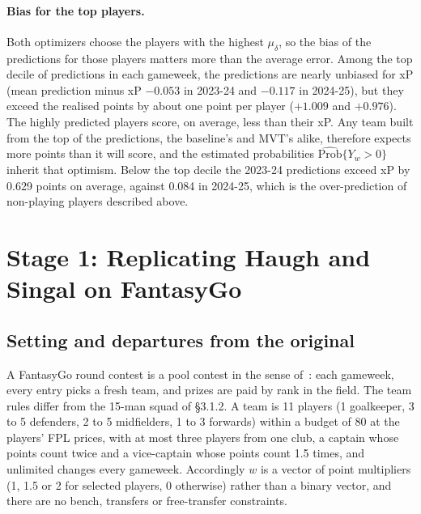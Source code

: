 \documentclass[12pt,oneside,a4paper]{book}
\theoremstyle{definition}
\theoremstyle{remark}
\begin{document}
	\paragraph{Bias for the top players.} Both optimizers choose the players with the highest
	$\mu_\delta$, so the bias of the predictions for those players matters more than the average
	error. Among the top decile of predictions in each gameweek, the predictions are nearly unbiased
	for xP (mean prediction minus xP $-0.053$ in 2023-24 and $-0.117$ in 2024-25), but they exceed
	the realised points by about one point per player ($+1.009$ and $+0.976$). The highly predicted
	players score, on average, less than their xP. Any team built from the top of the predictions,
	the baseline's and MVT's alike, therefore expects more points than it will score, and the
	estimated probabilities $\widehat{\mathrm{Prob}}\{Y_w>0\}$ inherit that optimism. Below the top
	decile the 2023-24 predictions exceed xP by 0.629 points on average, against 0.084 in 2024-25,
	which is the over-prediction of non-playing players described above.

	\section{Stage 1: Replicating Haugh and Singal on FantasyGo}
	\label{sec:s1}

	\subsection{Setting and departures from the original}
	\label{sec:s1-setting}

	A FantasyGo round contest is a pool contest in the sense of~\cite{haugh2021}: each gameweek,
	every entry picks a fresh team, and prizes are paid by rank in the field. The team rules differ
	from the 15-man squad of §3.1.2. A team is 11 players (1 goalkeeper, 3 to 5 defenders, 2 to 5
	midfielders, 1 to 3 forwards) within a budget of 80 at the players' FPL prices, with at most
	three players from one club, a captain whose points count twice and a vice-captain whose points
	count 1.5 times, and unlimited changes every gameweek. Accordingly $w$ is a vector of point
	multipliers (1, 1.5 or 2 for selected players, 0 otherwise) rather than a binary vector, and
	there are no bench, transfers or free-transfer constraints.
\end{document}
